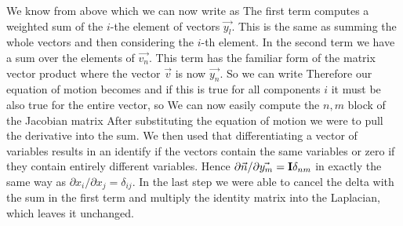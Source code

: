 We know from above 
which we can now write as 
The first term computes a weighted sum of the $i$-the element of vectors $\vec{y_l}$. This is the same as summing the whole vectors and then considering the $i$-th element. 
In the second term we have a sum over the elements of $\vec{v_n}$. This term has the familiar form of the matrix vector product 
where the vector $\vec{v}$ is now $\vec{y_n}$. So we can write
Therefore our equation of motion becomes 
and if this is true for all components $i$ it must be also true for the entire vector, so 
We can now easily compute the $n,m$ block of the Jacobian matrix 
After substituting the equation of motion we were to pull the derivative into the sum. We then used that differentiating a vector of variables results in an identify if the vectors contain the same variables or zero if they contain entirely different variables. Hence $\partial \vec{n}/\partial \vec{y_m} = {\bf I}\delta_{nm} $ in exactly the same way as $\partial x_i / \partial x_j = \delta_{ij}$. In the last step we were able to cancel the delta with the sum in the first term and multiply the identity matrix into the Laplacian, which leaves it unchanged. 


